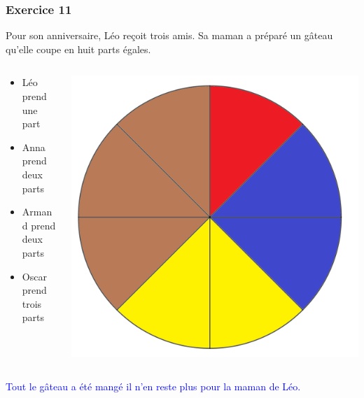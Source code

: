 \documentclass[xcolor={dvipsnames}]{beamer}
\begin{document}
\begin{frame}
	\frametitle{Exercice 11}
	
	Pour son anniversaire, Léo reçoit trois amis. Sa maman a préparé un gâteau qu'elle coupe en huit parts égales.
	
	
	\begin{columns}
		\begin{column}{0.5\textwidth}
			\begin{itemize}
				\item Léo prend une part
				\item Anna prend deux parts 
				\item Armand prend deux parts 
				\item Oscar prend trois parts
			\end{itemize}
		\end{column}
		\begin{column}{0.5\textwidth}
			\begin{center}
				\includegraphics[scale=0.08]{11_5}
			\end{center}
		\end{column}
	\end{columns}
	
	\textcolor{blue}{Tout le gâteau a été mangé il n'en reste plus pour la maman de Léo.}
\end{frame}
\end{document}
